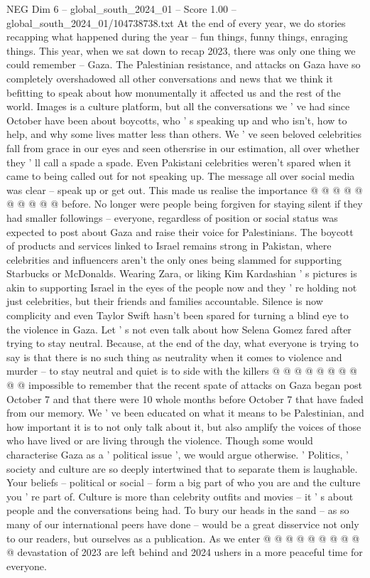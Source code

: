 \begin{textsample}{NEG Dim 6 – global\_south\_2024\_01 – Score 1.00 – global\_south\_2024\_01/104738738.txt}  \label{ex:f6_neg_348}
At the end of every year, we do stories recapping what happened during the year -- fun things, funny things, enraging things.
This year, when we sat down to recap 2023, there was only one thing we could remember -- Gaza.
The Palestinian resistance, and attacks on Gaza have so completely overshadowed all other conversations and news that we think it befitting to speak about how monumentally it affected us and the rest of the world.
Images is a culture platform, but all the conversations we ' ve had since October have been about boycotts, who ' s speaking up and who isn't, how to help, and why some lives matter less than others.
We ' ve seen beloved celebrities fall from grace in our eyes and seen othersrise in our estimation, all over whether they ' ll call a spade a spade.
Even Pakistani celebrities weren't spared when it came to being called out for not speaking up.
The message all over social media was clear -- speak up or get out.
This made us realise the importance @ @ @ @ @ @ @ @ @ @ before.
No longer were people being forgiven for staying silent if they had smaller followings -- everyone, regardless of position or social status was expected to post about Gaza and raise their voice for Palestinians.
The boycott of products and services linked to Israel remains strong in Pakistan, where celebrities and influencers aren't the only ones being slammed for supporting Starbucks or McDonalds.
Wearing Zara, or liking Kim Kardashian ' s pictures is akin to supporting Israel in the eyes of the people now and they ' re holding not just celebrities, but their friends and families accountable.
Silence is now complicity and even Taylor Swift hasn't been spared for turning a blind eye to the violence in Gaza.
Let ' s not even talk about how Selena Gomez fared after trying to stay neutral.
Because, at the end of the day, what everyone is trying to say is that there is no such thing as neutrality when it comes to violence and murder -- to stay neutral and quiet is to side with the killers @ @ @ @ @ @ @ @ @ @ impossible to remember that the recent spate of attacks on Gaza began post October 7 and that there were 10 whole months before October 7 that have faded from our memory.
We ' ve been educated on what it means to be Palestinian, and how important it is to not only talk about it, but also amplify the voices of those who have lived or are living through the violence.
Though some would characterise Gaza as a ' political issue ', we would argue otherwise. ' Politics, ' society and culture are so deeply intertwined that to separate them is laughable.
Your beliefs -- political or social -- form a big part of who you are and the culture you ' re part of.
Culture is more than celebrity outfits and movies -- it ' s about people and the conversations being had.
To bury our heads in the sand -- as so many of our international peers have done -- would be a great disservice not only to our readers, but ourselves as a publication.
As we enter @ @ @ @ @ @ @ @ @ @ devastation of 2023 are left behind and 2024 ushers in a more peaceful time for everyone.

\end{textsample}
